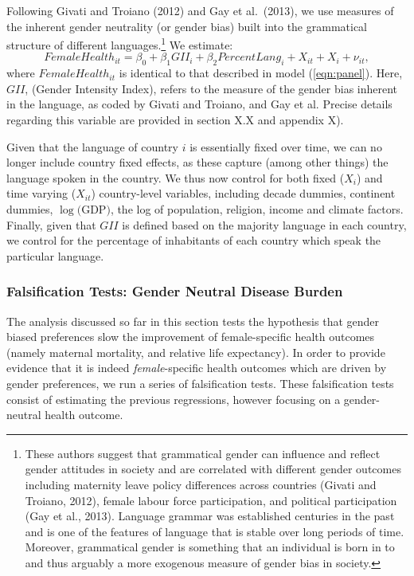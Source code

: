 \documentclass[11pt]{article}
\begin{document}
\begin{spacing}{1.4}
Following Givati and Troiano (2012) and Gay et al.\ (2013), we use measures of
the inherent gender neutrality (or gender bias) built into the grammatical 
structure of different languages.\footnote{These authors suggest that grammatical 
gender can influence and reflect gender attitudes in society and are correlated 
with different gender outcomes including maternity leave policy differences 
across countries (Givati and Troiano, 2012), female labour force participation, 
and political 
participation (Gay et al., 2013). Language grammar was established centuries in 
the past and is one of the features of language that is stable over long periods 
of time. Moreover, grammatical gender is something that an individual is born 
in to and thus arguably a more exogenous measure of gender bias in society.}  We 
estimate:
\begin{equation}
\label{eqn:gii}
FemaleHealth_{it} = \beta_0 + \beta_1 GII_i + \beta_2 PercentLang_i + X_{it} + X_i 
                  + \nu_{it},
\end{equation}
where $FemaleHealth_{it}$ is identical to that described in model 
(\ref{eqn:panel}). Here, $GII$, (Gender Intensity Index), refers to the measure 
of the gender bias inherent in the language, as coded by Givati and Troiano, and 
Gay et al.  Precise details regarding this variable are provided in section X.X 
and appendix X).

Given that the language of country $i$ is essentially fixed over time, we can no
longer include country fixed effects, as these capture (among other things) the
language spoken in the country.  We thus now control for both fixed ($X_{i}$) 
and time varying ($X_{it}$) country-level variables, including decade dummies, 
continent dummies, $\log($GDP$)$, the log of population, religion, income and 
climate factors.  Finally, given that $GII$ is defined based on the majority
language in each country, we control for the percentage of inhabitants of each
country which speak the particular language.

\subsubsection{Falsification Tests: Gender Neutral Disease Burden}
\label{ssscn:TB}
The analysis discussed so far in this section tests the hypothesis that gender
biased preferences slow the improvement of female-specific health outcomes 
(namely maternal mortality, and relative life expectancy).  In order to provide
evidence that it is indeed \emph{female}-specific health outcomes which are 
driven by gender preferences, we run a series of falsification tests.  These
falsification tests consist of estimating the previous regressions, however 
focusing on a gender-neutral health outcome.


\end{spacing}
\end{document}

